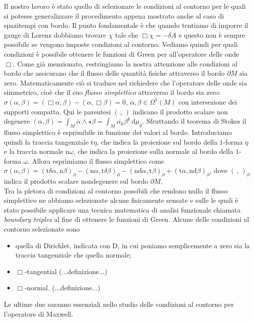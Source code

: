 \documentclass[11pt,a4paper]{article}
\begin{document}
	Il nostro lavoro è stato quello di selezionare le condizioni al contorno per le quali si potesse generalizzare il procedimento appena mostrato anche al caso di spazitempi con bordo. Il punto fondamentale è che quando tentiamo di imporre il gauge di Lorenz dobbiamo trovare $\chi$ tale che $\Box\chi=-\delta A$ e questo non è sempre possibile se vengono imposte condizioni al contorno. Vediamo quindi per quali condizioni è possibile ottenere le funzioni di Green per all'operatore delle onde $\Box$. Come già menzionato, restringiamo la nostra attenzione alle condizioni al bordo che assicurano che il flusso delle quantità fisiche attraverso il bordo $\partial M$ sia zero. Matematicamente ciò si traduce nel richiedere che l'operatore delle onde sia simmetrico, cioè che il suo \emph{flusso simplettico} attraverso il bordo sia zero: $\sigma(\alpha,\beta)=(\Box\alpha,\beta)-(\alpha,\Box\beta)=0$, $\alpha,\beta\in\Omega^1(M)$ con intersezione dei supporti compatta. Qui le parentesi $(\,,\,)$ indicano il prodotto scalare non degenere $(\alpha,\beta)=\int_{M} \overline{\alpha}\wedge\star\beta=\int_{M}\overline{\alpha_k}\beta^k\,\mathrm{d}\mu_g$. Sfruttando il teorema di Stokes il flusso simplettico è esprimibile in funzione dei valori al bordo. Introduciamo quindi la traccia tangenziale $\mathrm{t}\eta$, che indica la proiezione sul bordo della $1$-forma $\eta$ e la traccia normale $\mathrm{n}\omega$, che indica la proiezione sulla normale al bordo della $1$-forma $\omega$. Allora esprimiamo il flusso simplettico come $\sigma(\alpha,\beta)=
	(\mathrm{t}\delta\alpha,\mathrm{n}\beta)_\partial-
	(\mathrm{n}\alpha,\mathrm{t}\delta\beta)_\partial-
	(\mathrm{n}\mathrm{d}\alpha,\mathrm{t}\beta)_\partial+
	(\mathrm{t}\alpha,\mathrm{n}\mathrm{d}\beta)_\partial$, dove $(\,,\,)_\partial$ indica il prodotto scalare nondegenere sul bordo $\partial M$.\\
	
	Tra la pletora di condizioni al contorno possibili che rendono nullo il flusso simplettico ne abbiamo selezionate alcune fisicamente sensate e sulle le quali è stato possibile applicare una tecnica matematica di analisi funzionale chiamata \emph{boundary triples} al fine di ottenere le funzioni di Green. Alcune delle condizioni al contorno selezionate sono
	\begin{itemize}
		\item quella di Dirichlet, indicata con $\mathrm{D}$, in cui poniamo semplicemente a zero sia la traccia tangenziale che quella normale;
		\item $\Box$-tangential (...definizione...)
		\item $\Box$-normal. (...definizione...)
	\end{itemize}
	Le ultime due saranno essenziali nello studio delle condizioni al contorno per l'operatore di Maxwell.\\
	
\end{document}

